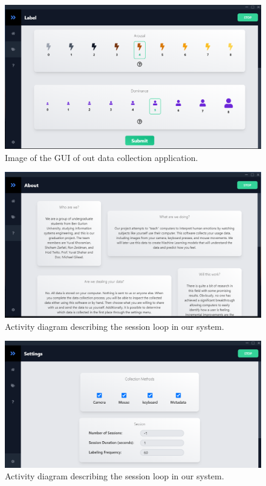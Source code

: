 \begin{figure}[htp]
    \centering
    \includegraphics[width=14cm]{figures/ui_label}   
    \caption{Image of the GUI of out data collection application.}
    \label{fig:ui_label} 
\end{figure}

\begin{figure}[htp]
    \centering
    \includegraphics[width=14cm]{figures/ui_about}   
    \caption{Activity diagram describing the session loop in our system.}
    \label{fig:ui_about} 
\end{figure}

\begin{figure}[htp]
    \centering
    \includegraphics[width=14cm]{figures/ui_settings}   
    \caption{Activity diagram describing the session loop in our system.}
    \label{fig:ui_settings} 
\end{figure}


